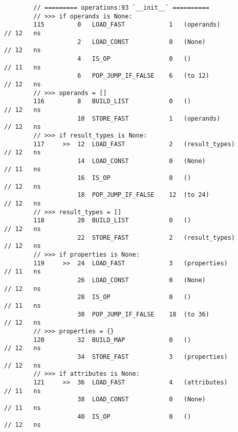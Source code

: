 \begin{code}
\begin{verbatim}
        // ========= operations:93 `__init__` ==========
        // >>> if operands is None:
        115         0   LOAD_FAST            1   (operands)                                         // 12   ns
                    2   LOAD_CONST           0   (None)                                             // 12   ns
                    4   IS_OP                0   ()                                                 // 11   ns
                    6   POP_JUMP_IF_FALSE    6   (to 12)                                            // 12   ns
        // >>> operands = []
        116         8   BUILD_LIST           0   ()                                                 // 12   ns
                    10  STORE_FAST           1   (operands)                                         // 12   ns
        // >>> if result_types is None:
        117     >>  12  LOAD_FAST            2   (result_types)                                     // 12   ns
                    14  LOAD_CONST           0   (None)                                             // 11   ns
                    16  IS_OP                0   ()                                                 // 12   ns
                    18  POP_JUMP_IF_FALSE    12  (to 24)                                            // 12   ns
        // >>> result_types = []
        118         20  BUILD_LIST           0   ()                                                 // 12   ns
                    22  STORE_FAST           2   (result_types)                                     // 12   ns
        // >>> if properties is None:
        119     >>  24  LOAD_FAST            3   (properties)                                       // 11   ns
                    26  LOAD_CONST           0   (None)                                             // 12   ns
                    28  IS_OP                0   ()                                                 // 11   ns
                    30  POP_JUMP_IF_FALSE    18  (to 36)                                            // 12   ns
        // >>> properties = {}
        120         32  BUILD_MAP            0   ()                                                 // 12   ns
                    34  STORE_FAST           3   (properties)                                       // 12   ns
        // >>> if attributes is None:
        121     >>  36  LOAD_FAST            4   (attributes)                                       // 11   ns
                    38  LOAD_CONST           0   (None)                                             // 11   ns
                    40  IS_OP                0   ()                                                 // 12   ns

\end{verbatim}
\end{code}
